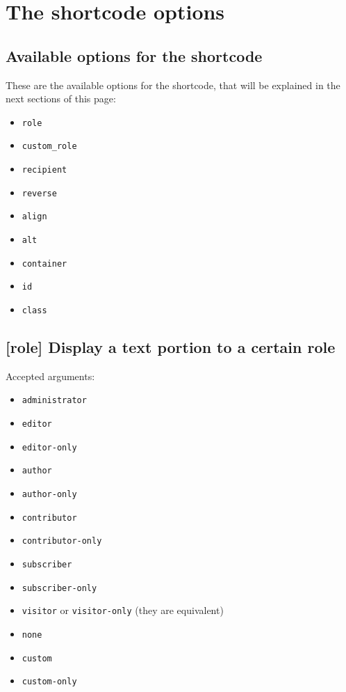 \documentclass[
	titlepage,
	headinclude,
	abstract=on,
	paper=a4,
	fontsize=11pt,
]{scrartcl}
\begin{document}
\section{The shortcode options}

\subsection{Available options for the shortcode}

These are the available options for the shortcode, that will be explained in the next sections of this page:

\begin{itemize}
 \item \verb+role+
 \item \verb+custom_role+
 \item \verb+recipient+
 \item \verb+reverse+
 \item \verb+align+
 \item \verb+alt+
 \item \verb+container+
 \item \verb+id+
 \item \verb+class+
\end{itemize}

\subsection{[role] Display a text portion to a certain role}

Accepted arguments:

\begin{itemize}
 \item \verb+administrator+
 \item \verb+editor+
 \item \verb+editor-only+
 \item \verb+author+
 \item \verb+author-only+
 \item \verb+contributor+
 \item \verb+contributor-only+
 \item \verb+subscriber+
 \item \verb+subscriber-only+
 \item \verb+visitor+ or \verb+visitor-only+ (they are equivalent)
 \item \verb+none+
 \item \verb+custom+
 \item \verb+custom-only+
\end{itemize}
\end{document}
